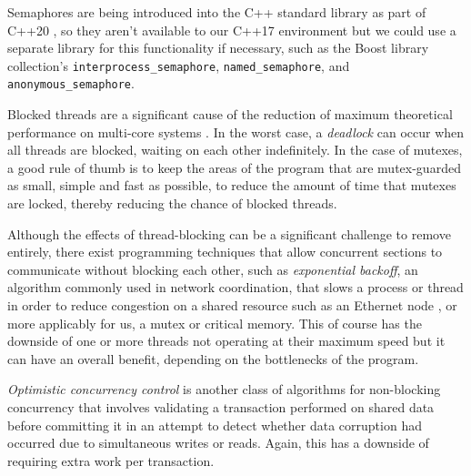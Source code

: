 \documentclass[11pt, a4paper, twocolumn]{article}
\begin{document}
Semaphores are being introduced into the C++ standard library as part of C++20 \citep{C20Sync}, so they aren't available to our C++17 environment but we could use a separate library for this functionality if necessary, such as the Boost library collection's \verb|interprocess_semaphore|, \verb|named_semaphore|, and \verb|anonymous_semaphore|.

Blocked threads are a significant cause of the reduction of maximum theoretical performance on multi-core systems \citep{Alemany1992}. In the worst case, a \emph{deadlock} can occur when all threads are blocked, waiting on each other indefinitely. In the case of mutexes, a good rule of thumb is to keep the areas of the program that are mutex-guarded as small, simple and fast as possible, to reduce the amount of time that mutexes are locked, thereby reducing the chance of blocked threads.

Although the effects of thread-blocking can be a significant challenge to remove entirely, there exist programming techniques that allow concurrent sections to communicate without blocking each other, such as \emph{exponential backoff}, an algorithm commonly used in network coordination, that slows a process or thread in order to reduce congestion on a shared resource such as an Ethernet node \citep{Goodman2019}, or more applicably for us, a mutex or critical memory. This of course has the downside of one or more threads not operating at their maximum speed but it can have an overall benefit, depending on the bottlenecks of the program.

\emph{Optimistic concurrency control} is another class of algorithms for non-blocking concurrency that involves validating a transaction performed on shared data before committing it \citep{Herlihy1993} in an attempt to detect whether data corruption had occurred due to simultaneous writes or reads. Again, this has a downside of requiring extra work per transaction.


\end{document}
